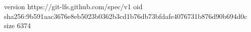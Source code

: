 version https://git-lfs.github.com/spec/v1
oid sha256:9b591aac3676e8eb5023b0362b3cd1b76db73bfdafe4076731b876d90b694d0c
size 6374
